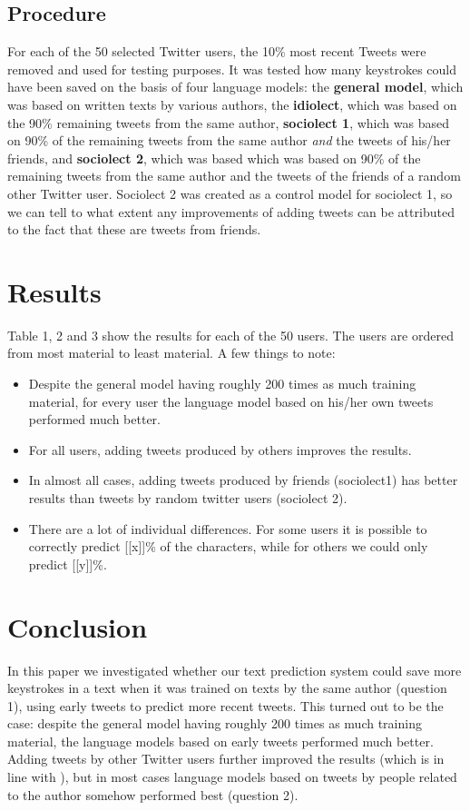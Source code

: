 \documentclass[11pt]{article}
\begin{document}
\subsection{Procedure}
For each of the 50 selected Twitter users, the 10\% most recent Tweets were removed and used for testing purposes. It was tested how many keystrokes could have been saved on the basis of four language models: the \textbf{general model}, which was based on written texts by various authors, the \textbf{idiolect}, which was based on the 90\% remaining tweets from the same author, \textbf{sociolect 1}, which was based on 90\% of the remaining tweets from the same author \emph{and} the tweets of his/her friends, and \textbf{sociolect 2}, which was based which was based on 90\% of the remaining tweets from the same author and the tweets of the friends of a random other Twitter user. Sociolect 2 was created as a control model for sociolect 1, so we can tell to what extent any improvements of adding tweets can be attributed to the fact that these are tweets from friends.

\section{Results}
Table 1, 2 and 3 show the results for each of the 50 users. The users are ordered from most material to least material. A few things to note:

\begin{itemize}
\item Despite the general model having roughly 200 times as much training material, for every user the language model based on his/her own tweets performed much better.
\item For all users, adding tweets produced by others improves the results.
\item In almost all cases, adding tweets produced by friends (sociolect1) has better results than tweets by random twitter users (sociolect 2).
\item There are a lot of individual differences. For some users it is possible to correctly predict [[x]]\% of the characters, while for others we could only predict [[y]]\%.
\end{itemize}

\section{Conclusion}
In this paper we investigated whether our text prediction system could save more keystrokes in a text when it was trained on texts by the same author (question 1), using early tweets to predict more recent tweets. This turned out to be the case: despite the general model having roughly 200 times as much training material, the language models based on early tweets performed much better. Adding tweets by other Twitter users further improved the results (which is in line with \cite{verberne12}), but in most cases language models based on tweets by people related to the author somehow performed best (question 2).



\end{document}

